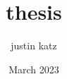 \documentclass{reedthesis}
\title{thesis}
\author{justin katz}
\date{March 2023}
\begin{document}
\newpage
% 




%
% 
% 
% 

\newpage

{}


\end{document}
